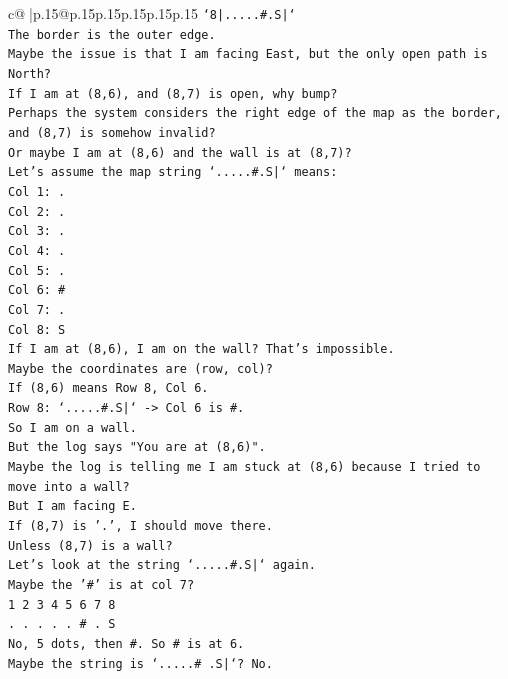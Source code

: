 \documentclass{article}
\begin{document}
{\begin{supertabular}{c@{$\;$}|p{.15\linewidth}@{}p{.15\linewidth}p{.15\linewidth}p{.15\linewidth}p{.15\linewidth}p{.15\linewidth}}
{{{\texttt{`8|.....\#.S|`} \\
\texttt{The border is the outer edge.} \\
\texttt{Maybe the issue is that I am facing East, but the only open path is North?} \\
\texttt{If I am at (8,6), and (8,7) is open, why bump?} \\
\texttt{Perhaps the system considers the right edge of the map as the border, and (8,7) is somehow invalid?} \\
\texttt{Or maybe I am at (8,6) and the wall is at (8,7)?} \\
\texttt{Let's assume the map string `.....\#.S|` means:} \\
\texttt{Col 1: .} \\
\texttt{Col 2: .} \\
\texttt{Col 3: .} \\
\texttt{Col 4: .} \\
\texttt{Col 5: .} \\
\texttt{Col 6: \#} \\
\texttt{Col 7: .} \\
\texttt{Col 8: S} \\
\texttt{If I am at (8,6), I am on the wall? That's impossible.} \\
\texttt{Maybe the coordinates are (row, col)?} \\
\texttt{If (8,6) means Row 8, Col 6.} \\
\texttt{Row 8: `.....\#.S|` {-}> Col 6 is \#.} \\
\texttt{So I am on a wall.} \\
\texttt{But the log says "You are at (8,6)".} \\
\texttt{Maybe the log is telling me I am stuck at (8,6) because I tried to move into a wall?} \\
\texttt{But I am facing E.} \\
\texttt{If (8,7) is '.', I should move there.} \\
\texttt{Unless (8,7) is a wall?} \\
\texttt{Let's look at the string `.....\#.S|` again.} \\
\texttt{Maybe the '\#' is at col 7?} \\
\texttt{1 2 3 4 5 6 7 8} \\
\texttt{. . . . . \# . S} \\
\texttt{No, 5 dots, then \#. So \# is at 6.} \\
\texttt{Maybe the string is `.....\# .S|`? No.} \\
}}}
\end{supertabular}}
\end{document}
